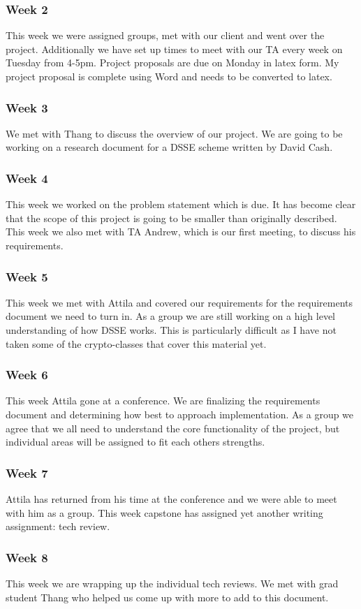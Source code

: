 \subsubsection{Week 2}
This week we were assigned groups, met with our client and went over the project. Additionally we have set up times to meet with our TA every week on Tuesday from 4-5pm.
Project proposals are due on Monday in latex form. My project proposal is complete using Word and needs to be converted to latex.
\subsubsection{Week 3}
We met with Thang to discuss the overview of our project. We are going to be working on a research document for a DSSE scheme written by David Cash.
\subsubsection{Week 4}
This week we worked on the problem statement which is due. It has become clear that the scope of this project is going to be smaller than originally described. This week we also met with TA Andrew, which is our first meeting, to discuss his requirements.
\subsubsection{Week 5}
This week we met with Attila and covered our requirements for the requirements document we need to turn in. As a group we are still working on a high level understanding of how DSSE works. This is particularly difficult as I have not taken some of the crypto-classes that cover this material yet.
\subsubsection{Week 6}
This week Attila gone at a conference. We are finalizing the requirements document and determining how best to approach implementation. As a group we agree that we all need to understand the core functionality of the project, but individual areas will be assigned to fit each others strengths.
\subsubsection{Week 7}
Attila has returned from his time at the conference and we were able to meet with him as a group. This week capstone has assigned yet another writing assignment: tech review.
\subsubsection{Week 8}
This week we are wrapping up the individual tech reviews. We met with grad student Thang who helped us come up with more to add to this document.
